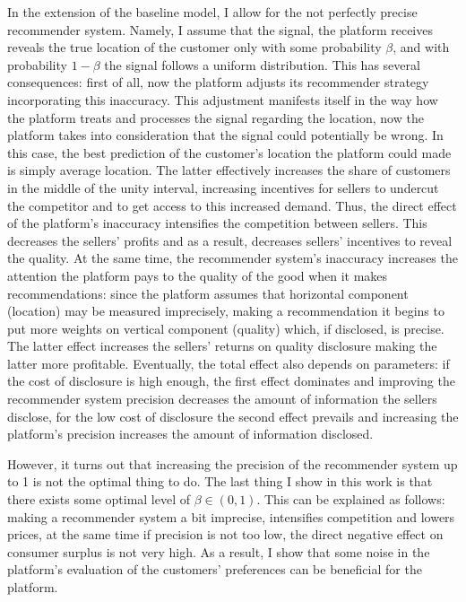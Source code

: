 \documentclass[a4paper]{article}
\begin{document}
	
In the extension of the baseline model, I allow for the not perfectly precise recommender system. Namely, I assume that the signal, the platform receives reveals the true location of the customer only with some probability $\beta$, and with probability $1 - \beta$ the signal follows a uniform distribution. This has several consequences: first of all, now the platform adjusts its recommender strategy incorporating this inaccuracy. This adjustment manifests itself in the way how the platform treats and processes the signal regarding the location, now the platform takes into consideration that the signal could potentially be wrong. In this case, the best prediction of the customer's location the platform could made is simply average location. The latter effectively increases the share of customers in the middle of the unity interval, increasing incentives for sellers to undercut the competitor and to get access to this increased demand. Thus, the direct effect of the platform's inaccuracy intensifies the competition between sellers. This decreases the sellers' profits and as a result, decreases sellers' incentives to reveal the quality. At the same time, the recommender system's inaccuracy increases the attention the platform pays to the quality of the good when it makes recommendations: since the platform assumes that horizontal component (location) may be measured imprecisely, making a recommendation it begins to put more weights on vertical component (quality) which, if disclosed, is precise. The latter effect increases the sellers' returns on quality disclosure making the latter more profitable. Eventually, the total effect also depends on parameters: if the cost of disclosure is high enough, the first effect dominates and improving the recommender system precision decreases the amount of information the sellers disclose, for the low cost of disclosure the second effect prevails and increasing the platform's precision increases the amount of information disclosed. 
	
	
	
	
	
However, it turns out that increasing the precision of the recommender system up to 1 is not the optimal thing to do. The last thing I show in this work is that there exists some optimal level of $\beta \in (0, 1)$. This can be explained as follows: making a recommender system a bit imprecise, intensifies competition and lowers prices, at the same time if precision is not too low, the direct negative effect on consumer surplus is not very high. As a result, I show that some noise in the platform's evaluation of the customers' preferences can be beneficial for the platform.
\end{document}
